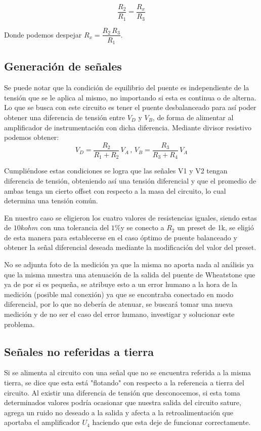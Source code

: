 \documentclass[11pt, a4paper]{article}
\begin{document}
\begin{equation}
\dfrac{R_2}{R_1} = \dfrac{R_x}{R_3}
\label{eq:EqPuente}
\end{equation}
	
	Donde podemos despejar $R_x = \dfrac{R_2 \, R_3}{R_1}$.
	
\subsection{Generación de señales}
	Se puede notar que la condición de equilibrio del puente es independiente de la tensión que se le aplica al mismo, no importando si esta es continua o de alterna.
	Lo que se busca con este circuito es tener el puente desbalanceado para así poder obtener una diferencia de tensión entre $V_D$ y $V_B$, de forma de alimentar al amplificador de instrumentación con dicha diferencia.
	Mediante divisor resistivo podemos obtener:
\begin{equation}
	V_D= \dfrac{R_2}{R_1+R_2} \, V_A \, , \, V_B = \dfrac{R_3}{R_3+R_4} \, V_A
\end{equation}

	Cumpliéndose estas condiciones se logra que las señales V1 y V2 tengan diferencia
de tensión, obteniendo así una tensión diferencial y que el promedio de ambas tenga un cierto offset con respecto a la masa del circuito, lo cual determina una tensión común. 
	
	En nuestro caso se eligieron los cuatro valores de resistencias iguales, siendo estas de $10k\si{ohm}$  con una tolerancia del $1\%$y se conecto a $R_2$ un preset de 1k, se eligió de esta manera para establecerse en el caso óptimo de puente balanceado y obtener la señal diferencial deseada mediante la modificación del valor del preset.
	
	No se adjunta foto de la medición ya que la misma no aporta nada al análisis ya que la misma muestra una atenuación de la salida del puente de Wheatstone que ya de por si es pequeña, se atribuye esto a un error humano a la hora de la medición (posible mal conexión) ya que se encontraba conectado en modo diferencial, por lo que no debería de atenuar, se buscará tomar una nueva medición y de no ser el caso del error humano, investigar y solucionar este problema.
	
\subsection{Señales no referidas a tierra}
	Si se alimenta al circuito con una señal que no se encuentra referida a la misma tierra, se dice que esta está "flotando" con respecto a la referencia a tierra del circuito. Al existir una diferencia de tensión que desconocemos, si esta toma determinados valores podría ocasionar que nuestra salida del circuito sature, agrega un ruido no deseado a la salida y afecta a la retroalimentación que aportaba el amplificador $\mathit{U_4}$ haciendo que esta deje de funcionar correctamente.
\end{document}
